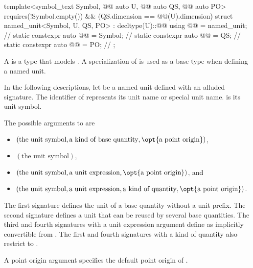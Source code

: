 \begin{codeblock}
{template<symbol_text Symbol, @@ auto U, @@ auto QS,
         @@ auto PO>
  requires(!Symbol.empty()) && (QS.dimension == @@(U).dimension)
struct named_unit<Symbol, U, QS, PO> : decltype(U)::@@ {
  using @@ = named_unit;              // \expos
  static constexpr auto @@ = Symbol;     // \expos
  static constexpr auto @@ = QS;  // \expos
  static constexpr auto @@ = PO;   // \expos
};

}
\end{codeblock}

\pnum
A  is a type that models .
A specialization of  is used as a base type when defining a named unit.

\pnum
In the following descriptions, let  be a named unit defined with an alluded signature.
The identifier of  represents
its unit name
or special unit name.
 is its unit symbol.

\pnum
The possible arguments to  are
\begin{itemize}
\item
$(\text{the unit symbol}, \text{a kind of base quantity}, \opt{\text{a point origin}})$,
\item
$(\text{the unit symbol})$,
\item
$(\text{the unit symbol}, \text{a unit expression}, \opt{\text{a point origin}})$, and
\item
$(\text{the unit symbol}, \text{a unit expression}, \text{a kind of quantity}, \opt{\text{a point origin}})$.
\end{itemize}

\pnum
The first signature defines the unit of a base quantity
without a unit prefix.
The second signature defines a unit
that can be reused by several base quantities.
The third and fourth signatures with a unit expression argument 
define  as implicitly convertible from .
The first and fourth signatures with a kind of quantity 
also restrict  to .

\pnum
A point origin argument specifies the default point origin of .

